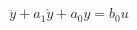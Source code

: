 \documentclass[12pt]{standalone}
\begin{document}
\begin{varwidth}{50in}
\begin{equation*}
\ddot{y} + a_1 \dot{y} + a_0 y = b_0 u
\end{equation*}
\end{varwidth}
\end{document}
